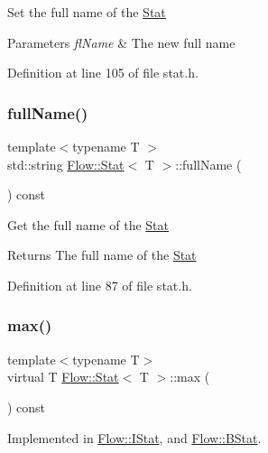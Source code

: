 Set the full name of the \hyperlink{class_flow_1_1_stat}{Stat} 
\begin{DoxyParams}{Parameters}
{\em fl\+Name} & The new full name \\
\hline
\end{DoxyParams}


Definition at line 105 of file stat.\+h.

\hypertarget{class_flow_1_1_stat_adbd9f33d895447e503a42ec4d270f4b4}{}\label{class_flow_1_1_stat_adbd9f33d895447e503a42ec4d270f4b4} 
\subsubsection{\texorpdfstring{full\+Name()}{fullName()}\hspace{0.1cm}{\footnotesize\ttfamily [2/2]}}
{\footnotesize\ttfamily template$<$typename T $>$ \\
std\+::string \hyperlink{class_flow_1_1_stat}{Flow\+::\+Stat}$<$ T $>$\+::full\+Name (\begin{DoxyParamCaption}{ }\end{DoxyParamCaption}) const}

Get the full name of the \hyperlink{class_flow_1_1_stat}{Stat} \begin{DoxyReturn}{Returns}
The full name of the \hyperlink{class_flow_1_1_stat}{Stat} 
\end{DoxyReturn}


Definition at line 87 of file stat.\+h.

\hypertarget{class_flow_1_1_stat_a61757491d2145c37460a1cd32a8db8bb}{}\label{class_flow_1_1_stat_a61757491d2145c37460a1cd32a8db8bb} 
\subsubsection{\texorpdfstring{max()}{max()}}
{\footnotesize\ttfamily template$<$typename T$>$ \\
virtual T \hyperlink{class_flow_1_1_stat}{Flow\+::\+Stat}$<$ T $>$\+::max (\begin{DoxyParamCaption}{ }\end{DoxyParamCaption}) const\hspace{0.3cm}{\ttfamily [pure virtual]}}



Implemented in \hyperlink{class_flow_1_1_i_stat_afe5c49dcc98e7960bbc8d7064e7c831a}{Flow\+::\+I\+Stat}, and \hyperlink{class_flow_1_1_b_stat_adcd3075bd06f64d690e66067047f0121}{Flow\+::\+B\+Stat}.

